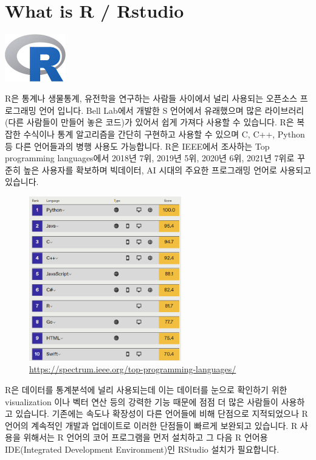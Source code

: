 \documentclass[
]{book}
\begin{document}
\hypertarget{what-is-r-rstudio}{%
\section{What is R / Rstudio}\label{what-is-r-rstudio}}

\includegraphics[width=1.04167in,height=\textheight]{images/01/r.jpg}

R은 통계나 생물통계, 유전학을 연구하는 사람들 사이에서 널리 사용되는 오픈소스 프로그래밍 언어 입니다. Bell Lab에서 개발한 S 언어에서 유래했으며 많은 라이브러리 (다른 사람들이 만들어 놓은 코드)가 있어서 쉽게 가져다 사용할 수 있습니다. R은 복잡한 수식이나 통계 알고리즘을 간단히 구현하고 사용할 수 있으며 C, C++, Python 등 다른 언어들과의 병행 사용도 가능합니다. R은 IEEE에서 조사하는 Top programming languages에서 2018년 7위, 2019년 5위, 2020년 6위, 2021년 7위로 꾸준히 높은 사용자를 확보하며 빅데이터, AI 시대의 주요한 프로그래밍 언어로 사용되고 있습니다.

\begin{figure}
\centering
\includegraphics[width=2.60417in,height=\textheight]{images/01/toplanguage2021.png}
\caption{\url{https://spectrum.ieee.org/top-programming-languages/}}
\end{figure}

R은 데이터를 통계분석에 널리 사용되는데 이는 데이터를 눈으로 확인하기 위한 visualization 이나 벡터 연산 등의 강력한 기능 때문에 점점 더 많은 사람들이 사용하고 있습니다. 기존에는 속도나 확장성이 다른 언어들에 비해 단점으로 지적되었으나 R 언어의 계속적인 개발과 업데이트로 이러한 단점들이 빠르게 보완되고 있습니다. R 사용을 위해서는 R 언어의 코어 프로그램을 먼저 설치하고 그 다음 R 언어용 IDE(Integrated Development Environment)인 RStudio 설치가 필요합니다.
\end{document}
